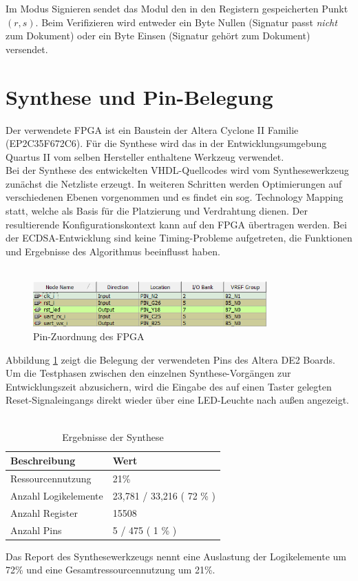Im Modus Signieren sendet das Modul den in den Registern gespeicherten Punkt $(r, s)$. Beim Verifizieren wird entweder ein Byte Nullen (Signatur passt \textit{nicht} zum Dokument) oder ein Byte Einsen (Signatur gehört zum Dokument) versendet. \\



\section{Synthese und Pin-Belegung}

Der verwendete FPGA ist ein Baustein der Altera Cyclone II Familie (EP2C35F672C6). Für die Synthese wird das in der Entwicklungsumgebung Quartus II vom selben Hersteller enthaltene Werkzeug verwendet. \\

Bei der Synthese des entwickelten VHDL-Quellcodes wird vom Synthesewerkzeug zunächst die Netzliste erzeugt. In weiteren Schritten werden Optimierungen auf verschiedenen Ebenen vorgenommen und es findet ein sog. Technology Mapping statt, welche als Basis für die Platzierung und Verdrahtung dienen. Der resultierende Konfigurationskontext kann auf den FPGA übertragen werden. Bei der ECDSA-Entwicklung sind keine Timing-Probleme aufgetreten, die Funktionen und Ergebnisse des Algorithmus beeinflusst haben.
\\ \\

\begin{figure}[H]
	\centering
	\includegraphics[width=0.8\textwidth]{bilder/pins}
	\caption{Pin-Zuordnung des FPGA}
	\label{fig:pins}
\end{figure}

Abbildung \ref{fig:pins} zeigt die Belegung der verwendeten Pins des Altera DE2 Boards. Um die Testphasen zwischen den einzelnen Synthese-Vorgängen zur Entwicklungszeit abzusichern, wird die Eingabe des auf einen Taster gelegten Reset-Signaleingangs direkt wieder über eine LED-Leuchte nach außen angezeigt. 
\\ \\

\begin{table} [h]
	\centering 
	\begin{tabular}{ | p{5cm} | p{5cm} | }
		\hline
		\textbf{Beschreibung} & \textbf{Wert}\\
		\hline
		Ressourcennutzung & 21\% \\
		\hline
		Anzahl Logikelemente & 23,781 / 33,216 ( 72 \% ) \\
		\hline
		Anzahl Register & 15508 \\
		\hline
		Anzahl Pins & 5 / 475 ( 1 \% ) \\
		\hline
	\end{tabular}
	\caption{Ergebnisse der Synthese}
	\label{tab:vhdl-impl-de2}
\end{table}

Das Report des Synthesewerkzeugs nennt eine Auslastung der Logikelemente um 72\% und eine Gesamtressourcennutzung um 21\%. 
\\ \\


